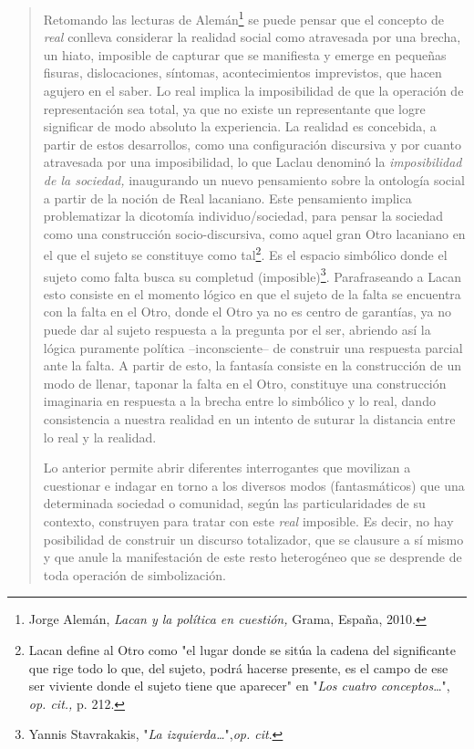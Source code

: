\documentclass{book}
\begin{document}
\begin{quote}
Retomando las lecturas de Alemán\footnote{Jorge Alemán, \emph{Lacan y la
  política en cuestión,} Grama, España, 2010.} se puede pensar que el
concepto de \emph{real} conlleva considerar la realidad social como
atravesada por una brecha, un hiato, imposible de capturar que se
manifiesta y emerge en pequeñas fisuras, dislocaciones, síntomas,
acontecimientos imprevistos, que hacen agujero en el saber. Lo real
implica la imposibilidad de que la operación de representación sea
total, ya que no existe un representante que logre significar de modo
absoluto la experiencia. La realidad es concebida, a partir de estos
desarrollos, como una configuración discursiva y por cuanto atravesada
por una imposibilidad, lo que Laclau denominó la \emph{imposibilidad de
la sociedad,} inaugurando un nuevo pensamiento sobre la ontología social
a partir de la noción de Real lacaniano. Este pensamiento implica
problematizar la dicotomía individuo/sociedad, para pensar la sociedad
como una construcción socio-discursiva, como aquel gran Otro lacaniano
en el que el sujeto se constituye como tal\footnote{Lacan define al Otro
  como "el lugar donde se sitúa la cadena del significante que rige todo
  lo que, del sujeto, podrá hacerse presente, es el campo de ese ser
  viviente donde el sujeto tiene que aparecer" en "\emph{Los cuatro
  conceptos}\ldots", \emph{op. cit.,} p. 212.}. Es el espacio simbólico
donde el sujeto como falta busca su completud (imposible)\footnote{Yannis
  Stavrakakis, "\emph{La izquierda\ldots{}}",\emph{op. cit}.}.
Parafraseando a Lacan esto consiste en el momento lógico en que el
sujeto de la falta se encuentra con la falta en el Otro, donde el Otro
ya no es centro de garantías, ya no puede dar al sujeto respuesta a la
pregunta por el ser, abriendo así la lógica puramente política
--inconsciente-- de construir una respuesta parcial ante la falta. A
partir de esto, la fantasía consiste en la construcción de un modo de
llenar, taponar la falta en el Otro, constituye una construcción
imaginaria en respuesta a la brecha entre lo simbólico y lo real, dando
consistencia a nuestra realidad en un intento de suturar la distancia
entre lo real y la realidad.

Lo anterior permite abrir diferentes interrogantes que movilizan a
cuestionar e indagar en torno a los diversos modos (fantasmáticos) que
una determinada sociedad o comunidad, según las particularidades de su
contexto, construyen para tratar con este \emph{real} imposible. Es
decir, no hay posibilidad de construir un discurso totalizador, que se
clausure a sí mismo y que anule la manifestación de este resto
heterogéneo que se desprende de toda operación de simbolización.


\end{quote}
\end{document}
